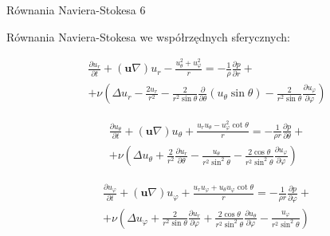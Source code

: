 \documentclass{beamer}
\begin{document}
\begin{frame}{Równania Naviera-Stokesa 6}

	Równania Naviera-Stokesa we współrzędnych sferycznych:

	\begin{equation}
		\begin{split}
			\frac{\partial u_r}{\partial t} +
			(\textbf{u}\nabla) u_r - \frac{u_\theta^2 + u_\varphi^2}{r} =
			 -\frac{1}{\rho}\frac{\partial p}{\partial r}
			+ \\+ \nu \left(\Delta u_r - \frac{2u_r}{r^2} -
			\frac{2}{r^2 \sin \theta} \frac{\partial}{\partial \theta}
			(u_\theta \sin \theta) -\frac{2}{r^2 \sin \theta}
			\frac{\partial u_\varphi}{\partial \varphi} \right)
		\end{split}
		\label{eq:part_u_r_sphere}
	\end{equation}
	
	\begin{equation}
		\begin{split}
			\frac{\partial u_\theta}{\partial t} +
			(\textbf{u}\nabla) u_\theta + \frac{u_r u_\theta - u_\varphi^2
			\cot \theta}{r} = -\frac{1}{\rho r}\frac{\partial p}{\partial \theta} +\\
			+ \nu \left(\Delta u_\theta + \frac{2}{r^2} \frac{\partial u_r}{\partial \theta} -
			\frac{u_\theta}{r^2 \sin^2 \theta} -
			\frac{2 \cos\theta}{r^2 \sin^2 \theta} \frac{\partial u_\varphi}{\partial \varphi}
			\right)
		\end{split}
		\label{eq:part_u_theta_sphere}
	\end{equation}

	\begin{equation}
		\begin{split}
			\frac{\partial u_\varphi}{\partial t} +
			(\textbf{u}\nabla) u_\varphi + \frac{u_r u_\varphi + u_\theta u_\varphi
			\cot \theta}{r} = -\frac{1}{\rho r }\frac{\partial p}{\partial \varphi} +\\
			+ \nu \left(\Delta u_\varphi + \frac{2}{r^2 \sin \theta} \frac{\partial u_r}{\partial \varphi} +
			\frac{2 \cos \theta}{r^2 \sin^2 \theta} \frac{\partial u_\theta}{\partial \varphi} -
			\frac{u_\varphi}{r^2 \sin^2 \theta} \right)
		\end{split}
		\label{eq:part_u_phi_sphere}
	\end{equation}
\end{frame}
\end{document}
